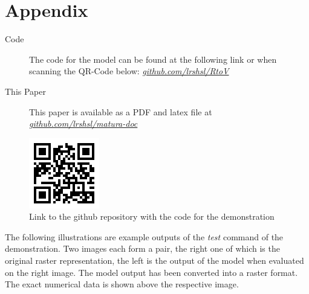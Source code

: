 \documentclass[12pt, a4paper, titlepage]{report}
\let\oldhref\href
\renewcommand{\href}[2]{\oldhref{#1}{\itshape#2}}
\begin{document}


\chapter{Appendix}

\begin{description}
   \item[Code] The code for the model can be found at the following link or when scanning the QR-Code below: \href{https://github.com/lrshsl/rtov.git}{github.com/lrshsl/RtoV}
   \item[This Paper] This paper is available as a PDF and latex file at \href{https://github.com/lrshsl/matura-doc/tree/main/matura_thesis}{github.com/lrshsl/matura-doc}
\end{description}


\begin{figure}[b]
   \centering
   \includegraphics{../rc/images/QrCode_LinkRepo.png}
   \caption{Link to the github repository with the code for the demonstration}
\end{figure}

\pagebreak

The following illustrations are example outputs of the \emph{test} command of the demonstration. Two images each form a pair, the right one of which is the original raster representation, the left is the output of the model when evaluated on the right image. The model output has been converted into a raster format. The exact numerical data is shown above the respective image.
\vspace{2cm}
\end{document}
